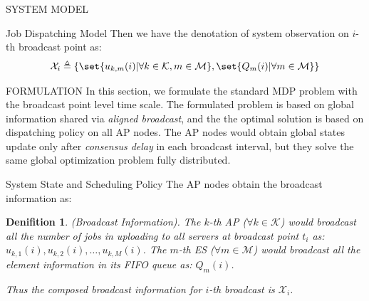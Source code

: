 \documentclass[10pt, conference, letterpaper]{IEEEtran}
\newtheorem{definition}{Denifition}
\newcommand{\define}{\triangleq}
\DeclarePairedDelimiter\set\{\}
\newcommand{\apSet}{\mathcal{K}}
\newcommand{\esSet}{\mathcal{M}}
\newcommand{\Obsv}{\mathcal{X}}
\begin{document}
\begin{section}{SYSTEM MODEL}
\begin{subsection}{Job Dispatching Model}
            Then we have the denotation of system observation on $i$-th broadcast point as:
            \begin{align}
                \Obsv_i \define \{ \set{u_{k,m}(i)|\forall k\in\apSet,m\in\esSet}, \set{Q_m(i)|\forall m\in\esSet} \}
            \end{align}
        \end{subsection}
    \end{section}

    \begin{section}{FORMULATION}
        \label{sec:formulation}
        In this section, we formulate the standard MDP problem with the broadcast point level time scale. The formulated problem is based on global information shared via \emph{aligned broadcast}, and the the optimal solution is based on dispatching policy on all AP nodes. The AP nodes would obtain global states update only after \emph{consensus delay} in each broadcast interval, but they solve the same global optimization problem fully distributed.

        \begin{subsection}{System State and Scheduling Policy}
            The AP nodes obtain the broadcast information as:
            \begin{definition}(Broadcast Information).
                The $k$-th AP ($\forall k\in\apSet$) would broadcast all the number of jobs in uploading to all servers at broadcast point $t_i$ as: $u_{k,1}(i), u_{k,2}(i), \dots, u_{k,M}(i)$.
                The $m$-th ES ($\forall m\in\esSet$) would broadcast all the element information in its FIFO queue as: $Q_m(i)$.

                Thus the composed broadcast information for $i$-th broadcast is $\Obsv_i$.
            \end{definition}


\end{subsection}
\end{section}
\end{document}
